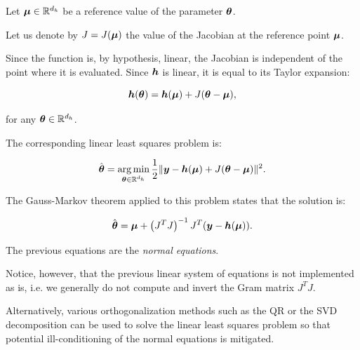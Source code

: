 \documentclass{beamer}
\begin{document}

\begin{frame}
Let $\boldsymbol{\mu} \in \mathbb{R}^{d_h}$ be a reference value of the
parameter $\boldsymbol{\theta}$. 

Let us denote by $J=J(\boldsymbol{\mu})$ the value of the Jacobian at the reference point
$\boldsymbol{\mu}$. 

Since the function is, by hypothesis, linear, the
Jacobian is independent of the point where it is evaluated. Since
$\boldsymbol{h}$ is linear, it is equal to its Taylor expansion:

$$
       \boldsymbol{h}(\boldsymbol{\theta}) = \boldsymbol{h}(\boldsymbol{\mu}) + J (\boldsymbol{\theta} - \boldsymbol{\mu}),
$$

for any $\boldsymbol{\theta} \in \mathbb{R}^{d_h}$.

\end{frame}


\begin{frame}
The corresponding linear least squares problem is:

$$
       \hat{\boldsymbol{\theta}} = \operatorname*{arg\,min}_{\boldsymbol{\theta} \in \mathbb{R}^{d_h}} \frac{1}{2} \|\boldsymbol{y} - \boldsymbol{h}(\boldsymbol{\mu}) + J (\boldsymbol{\theta} - \boldsymbol{\mu})\|^2.
$$

The Gauss-Markov theorem applied to this problem states that the
solution is:

$$
       \hat{\boldsymbol{\theta}} = \boldsymbol{\mu} + \left(J^T J\right)^{-1} J^T ( \boldsymbol{y} - \boldsymbol{h}(\boldsymbol{\mu})).
$$

\end{frame}


\begin{frame}
The previous equations are the \emph{normal equations}. 

Notice, however, that the previous linear system of equations 
is not implemented as is, i.e.
we generally do not compute and invert the Gram matrix $J^T J$.

Alternatively, various orthogonalization methods such as the QR or the
SVD decomposition can be used to solve the linear least squares problem
so that potential ill-conditioning of the normal equations is
mitigated.

\end{frame}
\end{document}
